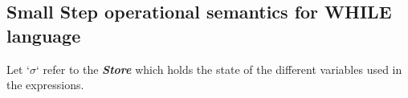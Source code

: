 \documentclass{article}
\begin{document}
\subsection{Small Step operational semantics for WHILE language}

Let `$\sigma$` refer to the \textbf{\emph{Store}} which holds the state of the different variables used in the expressions.

%
\newcommand{\ssrule}[4]{
  \multicolumn{1}{r}{
    \strut\mbox{\tt [{#1}]\qquad}
  } &
  \multicolumn{1}{l}{
    \dfrac{\strut\begin{array}{@{}c@{}} #3 \end{array}}
          {\strut\begin{array}{@{}c@{}} #2 ~~ \rightarrow ~~ #4 \end{array}}
  }
  \\~\\
}
\end{document}

